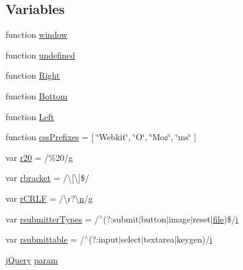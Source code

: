 \subsection*{Variables}
\begin{DoxyCompactItemize}
\item 
function \hyperlink{jquery-1_8x_8js_ad55530ae1e5978df8e721017c1fc8466}{window}
\item 
function \hyperlink{jquery-1_8x_8js_a08113a236cc18d2a9d5ce27e638012be}{undefined}
\item 
function \hyperlink{jquery-1_8x_8js_ac7f66efc33d974809d85fc5bdb00c6eb}{Right}
\item 
function \hyperlink{jquery-1_8x_8js_aff76c1cba4a00c678dfce0e0c5a5538a}{Bottom}
\item 
function \hyperlink{jquery-1_8x_8js_abef68bf244a1159a49fe3a2c153a65d2}{Left}
\item 
function \hyperlink{jquery-1_8x_8js_a2ed3892172b336458b8074254f4471da}{css\+Prefixes} = \mbox{[} \char`\"{}Webkit\char`\"{}, \char`\"{}O\char`\"{}, \char`\"{}Moz\char`\"{}, \char`\"{}ms\char`\"{} \mbox{]}
\item 
var \hyperlink{jquery-1_8x_8js_a0e39f72d512af99fb5992d66f1a1c821}{r20} = /\%20/\hyperlink{jqplot_8barRenderer_8min_8js_af0b07d7059bc78f82e8f61034df85ab3}{g}
\item 
var \hyperlink{jquery-1_8x_8js_a07117e28ee58d2d2664cfbaf741e10c1}{rbracket} = /\textbackslash{}\mbox{[}\textbackslash{}\mbox{]}\$/
\item 
var \hyperlink{jquery-1_8x_8js_a4fd9dfc4eb645b441a3e84730c50154b}{r\+C\+R\+LF} = /\textbackslash{}r?\textbackslash{}\hyperlink{jquery-1_8x_8min_8js_afc984c4f6c68ce30a0af99006f5f8d27}{n}/\hyperlink{jqplot_8barRenderer_8min_8js_af0b07d7059bc78f82e8f61034df85ab3}{g}
\item 
var \hyperlink{jquery-1_8x_8js_a0e9cd4ca08945afe827846f34a36c74a}{rsubmitter\+Types} = /$^\wedge$(?\+:submit$\vert$button$\vert$image$\vert$reset$\vert$\hyperlink{classfile}{file})\$/\hyperlink{jqplot_8barRenderer_8min_8js_ad34c35dd1d1578d93d112c22c7726e0f}{i}
\item 
var \hyperlink{jquery-1_8x_8js_a12d248d7e6c5985c5ea21f56fbef9e90}{rsubmittable} = /$^\wedge$(?\+:input$\vert$select$\vert$textarea$\vert$keygen)/\hyperlink{jqplot_8barRenderer_8min_8js_ad34c35dd1d1578d93d112c22c7726e0f}{i}
\item 
\hyperlink{xe__solid__enterprise__login_2js_2login_8js_a5d40f04b6bb824963a42ec4b5fbfe262}{j\+Query} \hyperlink{jquery-1_8x_8js_a24ced9cd3c9e1970a8cbe8d7adedc765}{param}

\end{DoxyCompactItemize}
